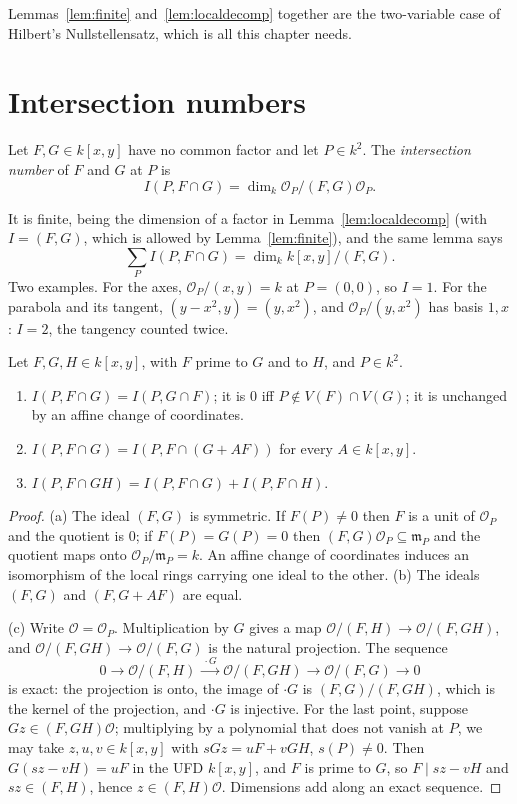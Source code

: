 Lemmas~\ref{lem:finite} and~\ref{lem:localdecomp} together are the two-variable case of Hilbert's Nullstellensatz, which is all this chapter
needs.

\section{Intersection numbers}

\begin{definition}
Let $F,G\in k[x,y]$ have no common factor and let $P\in k^2$. The \emph{intersection number} of $F$ and $G$ at $P$ is
\[
I(P,F\cap G)=\dim_k\mathcal O_P/(F,G)\mathcal O_P.
\]
\end{definition}

It is finite, being the dimension of a factor in Lemma~\ref{lem:localdecomp} (with $I=(F,G)$, which is allowed by Lemma~\ref{lem:finite}), and
the same lemma says
\begin{equation}\label{eq:sumI}
\sum_{P}I(P,F\cap G)=\dim_kk[x,y]/(F,G).
\end{equation}
Two examples. For the axes, $\mathcal O_P/(x,y)=k$ at $P=(0,0)$, so $I=1$. For the parabola and its tangent, $(y-x^2,y)=(y,x^2)$, and
$\mathcal O_P/(y,x^2)$ has basis $1,x$: $I=2$, the tangency counted twice.

\begin{proposition}\label{prop:intprops}
Let $F,G,H\in k[x,y]$, with $F$ prime to $G$ and to $H$, and $P\in k^2$.
\begin{enumerate}[label=(\alph*)]
\item $I(P,F\cap G)=I(P,G\cap F)$; it is $0$ iff $P\notin V(F)\cap V(G)$; it is unchanged by an affine change of coordinates.
\item $I(P,F\cap G)=I(P,F\cap(G+AF))$ for every $A\in k[x,y]$.
\item $I(P,F\cap GH)=I(P,F\cap G)+I(P,F\cap H)$.
\end{enumerate}
\end{proposition}
\begin{proof}
(a) The ideal $(F,G)$ is symmetric. If $F(P)\ne0$ then $F$ is a unit of $\mathcal O_P$ and the quotient is $0$; if $F(P)=G(P)=0$ then
$(F,G)\mathcal O_P\subseteq\mathfrak m_P$ and the quotient maps onto $\mathcal O_P/\mathfrak m_P=k$. An affine change of coordinates induces
an isomorphism of the local rings carrying one ideal to the other. (b) The ideals $(F,G)$ and $(F,G+AF)$ are equal.

(c) Write $\mathcal O=\mathcal O_P$. Multiplication by $G$ gives a map $\mathcal O/(F,H)\to\mathcal O/(F,GH)$, and $\mathcal O/(F,GH)\to\mathcal O/(F,G)$ is
the natural projection. The sequence
\[
0\to\mathcal O/(F,H)\xrightarrow{\;\cdot G\;}\mathcal O/(F,GH)\to\mathcal O/(F,G)\to0
\]
is exact: the projection is onto, the image of $\cdot G$ is $(F,G)/(F,GH)$, which is the kernel of the projection, and $\cdot G$ is injective.
For the last point, suppose $Gz\in(F,GH)\mathcal O$; multiplying by a polynomial that does not vanish at $P$, we may take $z,u,v\in k[x,y]$ with
$sGz=uF+vGH$, $s(P)\ne0$. Then $G(sz-vH)=uF$ in the UFD $k[x,y]$, and $F$ is prime to $G$, so $F\mid sz-vH$ and $sz\in(F,H)$, hence
$z\in(F,H)\mathcal O$. Dimensions add along an exact sequence.
\end{proof}

